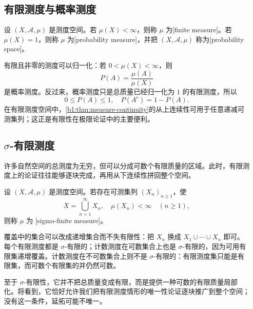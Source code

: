 \subsection{有限测度与概率测度}
\label{b1:subsec:020104}

\begin{definition}
\label{b1:def:finite-probability-measure}
设 \((X,\mathcal A,\mu)\) 是测度空间。若 \(\mu(X)<\infty\)，则称 \(\mu\) 为[finite measure]。若 \(\mu(X)=1\)，则称 \(\mu\) 为[probability measure]，并把 \((X,\mathcal A,\mu)\) 称为[probability space]。
\end{definition}

有限且非零的测度可以归一化：若 \(0<\mu(X)<\infty\)，则
\[
P(A)=\frac{\mu(A)}{\mu(X)}
\]
是概率测度。反过来，概率测度只是总质量已经归一化为 \(1\) 的有限测度，所以
\[
0\leq P(A)\leq1,
\quad
P(A^{\mathrm c})=1-P(A).
\]
在有限测度空间中，\cref{b1:thm:measure-continuity}的从上连续性可用于任意递减可测集列；这正是有限性在极限论证中的主要便利。

\subsection{\texorpdfstring{\(\sigma\)}{\AnalysisPdfSigma}-有限测度}
\label{b1:subsec:020105}

许多自然空间的总测度为无穷，但可以分成可数个有限质量的区域。此时，有限测度上的论证往往能够逐块完成，再用从下连续性拼回整个空间。

\begin{definition}
\label{b1:def:sigma-finite-measure}
设 \((X,\mathcal A,\mu)\) 是测度空间。若存在可测集列 \((X_n)_{n\geq1}\)，使
\[
X=\bigcup_{n=1}^{\infty}X_n,
\quad
\mu(X_n)<\infty\quad(n\geq1),
\]
则称 \(\mu\) 为 [sigma-finite measure]。
\end{definition}

覆盖中的集合可以改成递增集合而不失有限性：把 \(X_n\) 换成 \(X_1\cup\cdots\cup X_n\) 即可。每个有限测度都是 \(\sigma\)-有限的；计数测度在可数集合上也是 \(\sigma\)-有限的，因为可用有限集递增覆盖。计数测度在不可数集合上则不是 \(\sigma\)-有限的：有限测度集只能是有限集，而可数个有限集的并仍然可数。

\ProseParagraphBreak

至于 \(\sigma\)-有限性，它并不把总质量变成有限，而是提供一种可数的有限质量局部化。将看到，它恰好允许我们把有限测度情形的唯一性论证逐块推广到整个空间；没有这一条件，延拓可能不唯一。
